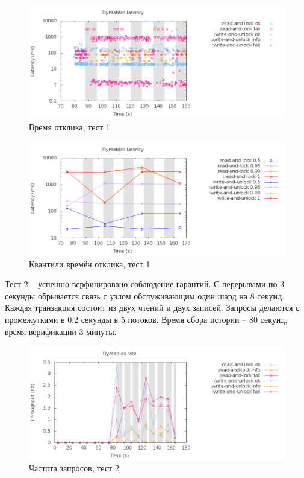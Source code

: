 \documentclass[pdftex,ptm,14pt,a4paper]{extreport}
\theoremstyle{definition}
\begin{document}
\begin{figure}[h]
    \includegraphics[scale=0.6]{dyntables-1/latency-raw.png}
    \caption{Время отклика, тест 1}
\end{figure}

\begin{figure}[h]
    \includegraphics[scale=0.6]{dyntables-1/latency-quantiles.png}
    \caption{Квантили времён отклика, тест 1}
\end{figure}

Тест 2 -- успешно верфицировано соблюдение гарантий. С перерывами по 3 секунды
обрывается связь с узлом обслуживающим один шард на 8 секунд. Каждая транзакция состоит
из двух чтений и двух записей. Запросы делаются с промежутками в 0.2 секунды в 5 потоков.
Время сбора истории -- 80 секунд, время верификации 3 минуты.

\begin{figure}[h]
    \includegraphics[scale=0.6]{dyntables-2/rate.png}
    \caption{Частота запросов, тест 2}
\end{figure}
\end{document}
